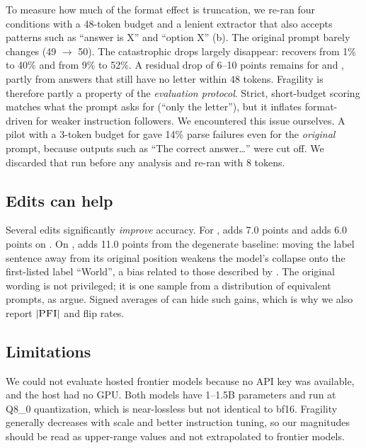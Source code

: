 To measure how much of the format effect is truncation, we re-ran four \llama \arc conditions with a 48-token budget and a lenient extractor that also accepts patterns such as ``answer is X'' and ``option X'' (b). The original prompt barely changes (49 $\to$ 50). The catastrophic drops largely disappear:  recovers from 1\% to 40\% and  from 9\% to 52\%. A residual drop of 6--10 points remains for \syn and , partly from answers that still have no letter within 48 tokens. Fragility is therefore partly a property of the \emph{evaluation protocol}. Strict, short-budget scoring matches what the prompt asks for (``only the letter''), but it inflates format-driven \pfi for weaker instruction followers. We encountered this issue ourselves. A pilot with a 3-token budget for \arc gave 14\% parse failures even for the \emph{original} prompt, because outputs such as ``The correct answer\dots'' were cut off. We discarded that run before any analysis and re-ran \arc with 8 tokens.

\subsection{Edits can help}
\label{sec:edits_help}

Several edits significantly \emph{improve} accuracy. For \llama, \reord adds 7.0 points and \syn adds 6.0 points on \sst. On \agnews, \reord adds 11.0 points from the degenerate baseline: moving the label sentence away from its original position weakens the model's collapse onto the first-listed label ``World'', a bias related to those described by \citet{zhao2021calibrate}. The original wording is not privileged; it is one sample from a distribution of equivalent prompts, as \citet{mizrahi2024state} argue. Signed averages of \pfi can hide such gains, which is why we also report $|\textsc{PFI}|$ and flip rates.

\subsection{Limitations}
\label{sec:limitations}

 We could not evaluate hosted frontier models because no API key was available, and the host had no GPU. Both models have 1--1.5B parameters and run at Q8\_0 quantization, which is near-lossless but not identical to bf16. Fragility generally decreases with scale and better instruction tuning, so our magnitudes should be read as upper-range values and not extrapolated to frontier models.

